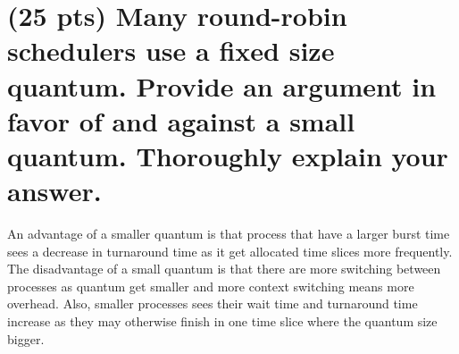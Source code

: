 \documentclass{article}
\begin{document}
\section{(25 pts) Many round-robin schedulers use a fixed size quantum. Provide an argument in favor of and against a small quantum. Thoroughly explain your answer.}
An advantage of a smaller quantum is that process that have a larger burst time sees a decrease in turnaround time as it get allocated time slices more frequently. 
The disadvantage of a small quantum is that there are more switching between processes as quantum get smaller and more context switching means more overhead. 
Also, smaller processes sees their wait time and turnaround time increase as they may otherwise finish in one time slice where the quantum size bigger.
\end{document}
